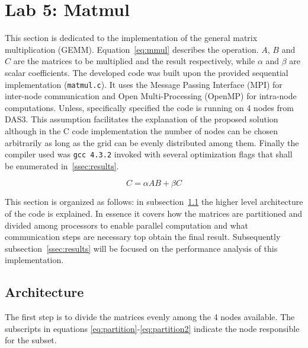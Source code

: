\section{Lab 5: Matmul}

This section is dedicated to the implementation of the general matrix multiplication (GEMM). Equation~\ref{eq:mmul} describes the operation.
$A$, $B$ and $C$ are the matrices to be multiplied and the result respectively, while $\alpha$ and $\beta$ are scalar coefficients. 
The developed code was built upon the provided sequential implementation (\texttt{matmul.c}).
It uses the Message Passing Interface (MPI) for inter-node communication and Open Multi-Processing (OpenMP) for intra-node computations.
Unless, specifically specified the code is running on 4 nodes from DAS3. This assumption facilitates the explanation of the proposed solution although in the C code implementation the number of nodes can be chosen arbitrarily as long as the grid can be evenly distributed among them.
Finally the compiler used was \texttt{gcc 4.3.2} invoked with several optimization flags that shall be enumerated in~\ref{ssec:results}.

\begin{equation}
C = \alpha AB + \beta C
\label{eq:mmul}
\end{equation}

This section is organized as follows: in subsection~\ref{ssec:arch} the higher level architecture of the code is explained.
In essence it covers how the matrices are partitioned and divided among processors to enable parallel computation and what communication steps are necessary top obtain the final result.
Subsequently subsection~\ref{ssec:results} will be focused on the performance analysis of this implementation.

\subsection{Architecture}
\label{ssec:arch}

The first step is to divide the matrices evenly among the 4 nodes available.
The subscripts in equations \ref{eq:partition}-\ref{eq:partition2} indicate the node responsible for the subset. 

